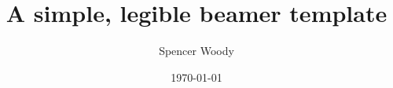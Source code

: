


\title[Beamer template]{A simple, legible beamer template}
\author{Spencer Woody} %
\date{\today} 
















